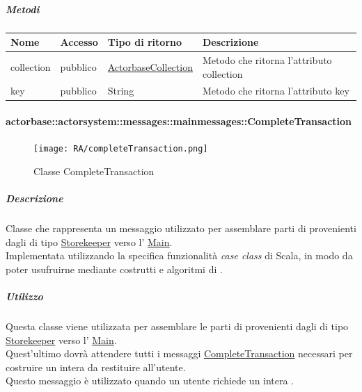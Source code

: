 \documentclass{scalatekids-article}
\begin{document}
\subparagraph{Metodi}
\begin{tabular}{| p{3cm} | p{1.5cm} | p{3.5cm} | p{9cm} |}
  \hline
  Nome & Accesso & Tipo di ritorno & Descrizione\\
  \hline
  collection & pubblico & \hyperref[sec:actorbase::actorsystem::utils::ActorbaseCollection]{ActorbaseCollection} & Metodo che ritorna l'attributo collection\\
  \hline
  key & pubblico & String & Metodo che ritorna l'attributo key\\
  \hline
\end{tabular}

\paragraph{actorbase::actorsystem::messages::mainmessages::CompleteTransaction}
\label{sec:actorbase::actorsystem::messages::mainmessages::CompleteTransaction}

\begin{figure}[H]
  \begin{center}
    \texttt{[image: RA/completeTransaction.png]}
    \caption{Classe CompleteTransaction}
  \end{center}
\end{figure}

\subparagraph{Descrizione}
Classe che rappresenta un messaggio utilizzato per assemblare parti di
 provenienti dagli  di tipo
\hyperref[sec:actorbase::actorsystem::actors::storekeeper::Storekeeper]{Storekeeper}
verso l'
\hyperref[sec:actorbase::actorsystem::actors::main::Main]{Main}.\\Implementata
utilizzando la specifica funzionalità \textit{case class} di Scala, in modo da
poter usufruirne mediante costrutti e algoritmi di .

\subparagraph{Utilizzo}
Questa classe viene utilizzata per assemblare le parti di  provenienti dagli 
di tipo \hyperref[sec:actorbase::actorsystem::actors::storekeeper::Storekeeper]{Storekeeper} verso l'
\hyperref[sec:actorbase::actorsystem::actors::main::Main]{Main}.\\Quest'ultimo
dovrà attendere tutti i messaggi
\hyperref[sec:actorbase::actorsystem::messages::mainmessages::CompleteTransaction]{CompleteTransaction}
necessari per costruire un intera  da restituire all'utente.\\Questo
messaggio è utilizzato quando un utente richiede un intera .
\end{document}
